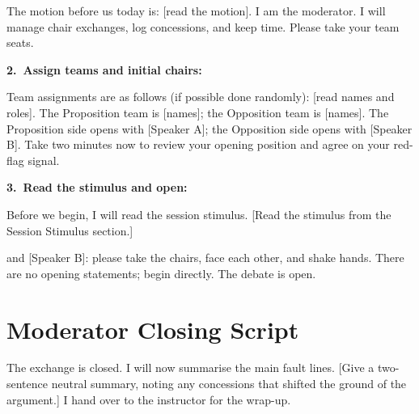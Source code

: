 \noindent The motion before us today is: [read the motion]. I am the moderator.
I will manage chair exchanges, log concessions, and
keep time. Please take your team seats.

\noindent \textbf{2.\ Assign teams and initial chairs:}

\noindent Team assignments are as follows (if possible done randomly): [read names and roles]. The
Proposition team is [names]; the Opposition team is [names]. The
Proposition side opens with [Speaker A]; the Opposition side opens
with [Speaker B]. Take two minutes now to review your opening
position and agree on your red-flag signal.

\noindent \textbf{3.\ Read the stimulus and open:}

\noindent Before we begin, I will read the session stimulus. [Read the
stimulus from the Session Stimulus section.]

\medskip
\noindent [Speaker A] and [Speaker B]: please take the chairs, face each
other, and shake hands. There are no opening statements; begin
directly. The debate is open.

\section*{Moderator Closing Script}

\noindent The exchange is closed. I will now summarise the main fault lines.
[Give a two-sentence neutral summary, noting any concessions that
shifted the ground of the argument.] I hand over to the instructor
for the wrap-up.



